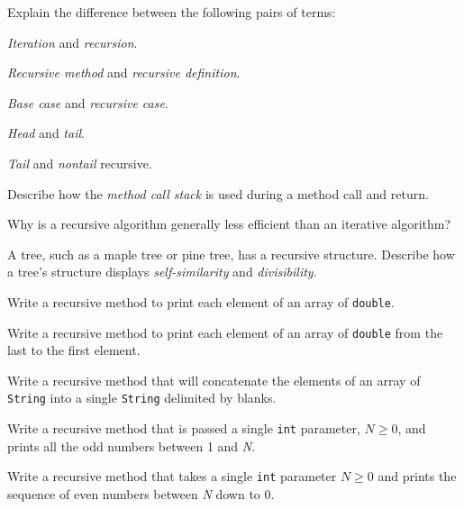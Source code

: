 \begin{EXRtwo}

\item  Explain the difference between the following pairs of terms:
\begin{EXRtwoLL}
\item  {\it Iteration} and {\it recursion}.
\item  {\it Recursive method} and {\it recursive definition}.
\item  {\it Base case} and {\it recursive case}.
\item  {\it Head} and {\it tail}.
\item  {\it Tail} and {\it nontail} recursive.
\end{EXRtwoLL}


\item  Describe how the {\it method call stack}
is used during a method call and return.

\item  Why is a recursive algorithm generally less efficient
than an iterative algorithm?

\item  A tree, such as a maple tree or pine tree, has
a recursive structure.   Describe how a tree's structure
displays {\it self-similarity} and {\it divisibility}.

\item  Write a recursive method to print each element
of an array of {\tt double}.

\item  Write a recursive method to print each element
of an array of {\tt double} from the last to the first element.

\item  Write a recursive method that will concatenate
the elements of an array of {\tt String} into a
single {\tt String} delimited by blanks.

\item  Write a recursive method that is passed a single {\tt int}
parameter, $N \geq 0$, and prints all the odd numbers between 1 and {\it N}.

\item
Write a recursive method that takes a single {\tt int} parameter \mbox{$N \geq 0$}
and prints the sequence of even numbers between {\it N} down to 0.


\end{EXRtwo}
